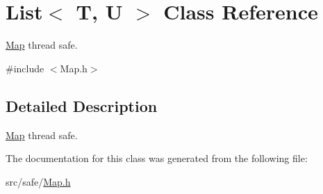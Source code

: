 \hypertarget{class_list_3_01_t_00_01_u_01_4}{\section{List$<$ T, U $>$ Class Reference}
\label{class_list_3_01_t_00_01_u_01_4}
}


\hyperlink{class_map}{Map} thread safe.  




{\ttfamily \#include $<$Map.\-h$>$}



\subsection{Detailed Description}
\hyperlink{class_map}{Map} thread safe. 

The documentation for this class was generated from the following file\-:\begin{DoxyCompactItemize}
\item 
src/safe/\hyperlink{_map_8h}{Map.\-h}\end{DoxyCompactItemize}
